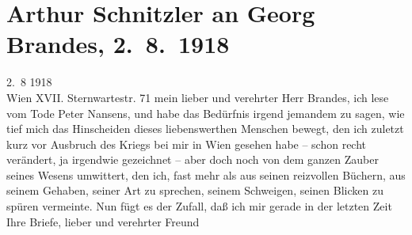 

               \section[Arthur Schnitzler an Georg Brandes, 2. 8. 1918]{ Arthur Schnitzler an Georg Brandes, 2. 8. 1918}\nopagebreak{}\rehead{ }\begin{ledgroupsized}[t]{13cm}\normalsize\beginnumbering{} \toendnotes[C]{\smallbreak\pagebreak[2]} 
\toendnotes[C]{\smallbreak}\pstart
           \raggedleft{}{\pb}2. 8 1918{\\}Wien XVII. Sternwartestr. 71\pend
           \pstart{}mein lieber und verehrter Herr Brandes,\pend\pstart
           ich lese vom Tode Peter Nansens, und habe das
                    Bedürfnis irgend jemandem zu sagen, wie tief mich das Hinscheiden dieses
                    liebenswerthen Menschen bewegt, den ich zuletzt kurz vor Ausbruch des Kriegs bei
                    mir in Wien gesehen habe – schon recht verändert, ja irgendwie gezeichnet – aber
                    doch noch von dem ganzen Zauber seines Wesens umwittert, den ich, fast mehr als
                    aus seinen reizvollen Büchern, aus seinem Gehaben, seiner Art zu sprechen,
                    seinem Schweigen, seinen Blicken zu spüren vermeinte. Nun fügt es der Zufall,
                    daß ich mir gerade in der letzten Zeit Ihre Briefe, lieber und verehrter Freund

\end{ledgroupsized}
